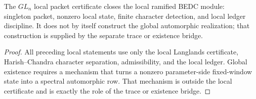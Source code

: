 \begin{theorem}
\label{thm:unified-reality-gln-local-certificate-boundary}
The $GL_n$ local packet certificate closes the local ramified BEDC
module: singleton packet, nonzero local state, finite character
detection, and local ledger discipline. It does not by itself construct
the global automorphic realization; that construction is supplied by the
separate trace or existence bridge.
\end{theorem}
\begin{proof}
All preceding local statements use only the local Langlands certificate,
Harish--Chandra character separation, admissibility, and the local
ledger. Global existence requires a mechanism that turns a nonzero
parameter-side fixed-window state into a spectral automorphic row. That
mechanism is outside the local certificate and is exactly the role of
the trace or existence bridge.
\end{proof}
